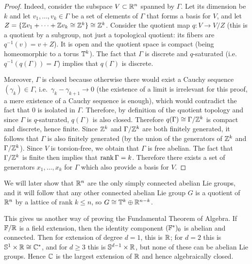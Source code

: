 \begin{proof}
    Indeed, consider the subspace $V\subset \mathbb{R}^n$ spanned by $\Gamma$. Let its dimension be $k$ and let $v_1,\ldots,v_k\in \Gamma$ be a set of elements of $\Gamma$ that forms a basis for $V$, and let $Z=\{\mathbb{Z} v_1+\cdots +\mathbb{Z} v_k\cong \mathbb{Z}^k\}\cong\mathbb{Z}^k$. Consider the quotient map $q:V\to V/Z$ (this is a quotient by a subgroup, not just a topological quotient: its fibers are $q^{-1}(v)=v+Z$). It is open and the quotient space is compact (being homeomorphic to a torus $\mathbb{T}^k$). The fact that $\Gamma$ is discrete and $q$-saturated (i.e.~$q^{-1}(q(\Gamma))=\Gamma$) implies that $q(\Gamma)$ is discrete. 
    
    Moreover, $\Gamma$ is closed because otherwise there would exist a Cauchy sequence $(\gamma_k)\in\Gamma$, i.e.~$\gamma_k-\gamma_{k+1}\to 0$ (the existence of a limit is irrelevant for this proof, a mere existence of a Cauchy sequence is enough), which would contradict the fact that $0$ is isolated in $\Gamma$. Therefore, by definition of the quotient topology and since $\Gamma$ is $q$-saturated, $q(\Gamma)$ is also closed.  Therefore $q(\Gamma)\cong \Gamma\slash \mathbb{Z}^k$ is compact and discrete, hence finite. Since $\mathbb{Z}^k$ and $\Gamma\slash \mathbb{Z}^k$ are both finitely generated, it follows that $\Gamma$ is also finitely generated (by the union of the generators of $\mathbb{Z}^k$ and $\Gamma\slash \mathbb{Z}^k$). Since $V$ is torsion-free, we obtain that $\Gamma$ is free abelian.  The fact that $\Gamma\slash \mathbb{Z}^k$ is finite then implies that $\operatorname{rank} \Gamma=k$. Therefore there exists a set of generators $x_1,\ldots,x_k$ for $\Gamma$ which also provide a basis for $V$.
\end{proof}
\begin{rem}
    We will later show that $\mathbb{R}^n$ are the only simply connected abelian Lie groups, and it will follow that any other connected abelian Lie group $G$ is a quotient of $\mathbb{R}^n$ by a lattice of rank $k\leq n$, so $G\cong \mathbb{T}^k\oplus \mathbb{R}^{n-k}$.
    
    This gives us another way of proving the Fundamental Theorem of Algebra. If $\mathbb{F}/\mathbb{R}$ is a field extension, then the identity component $(\mathbb{F}^\ast)_0$ is abelian and connected. Then for extension of degree $d=1$, this is $\mathbb{R}$; for $d=2$ this is $\mathbb{S}^1\times\mathbb{R}\cong\mathbb{C}^\ast$, and for $d\geq 3$ this is $\mathbb{S}^{d-1}\times\mathbb{R}$, but none of these can be abelian Lie groups. Hence $\mathbb{C}$ is the largest extension of $\mathbb{R}$ and hence algebraically closed.
\end{rem}





